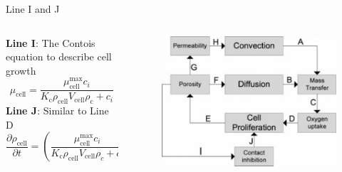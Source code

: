 \documentclass[11pt,t]{beamer}
\begin{document}
\begin{frame}[fragile]{Line I and J}  

	\begin{columns}[t]
		\begin{column}{.75\textwidth}
\textbf{Line I}: The Contois equation  to describe cell growth
\[
\mu _ { \mathrm { cell } } = \frac { \mu _ { \mathrm { cell } } ^ { \max } c _ { i } } { K _ { \mathrm { c } } \rho _ { \mathrm { cell } } V _ { \mathrm { cell } } \rho _ { \mathrm { c } } + c _ { i } }
\]
\textbf{Line J}: Similar to Line D
\[
\frac { \partial \rho _ { \mathrm { cell } } } { \partial t } = \left( \frac { \mu _ { \mathrm { cell } } ^ { \max } c _ { i } } { K _ { \mathrm { c } } \rho _ { \mathrm { cell } } V _ { \mathrm { cell } } \rho _ { c } + c _ { i } } - k _ { d } \right) \rho _ { \mathrm { cell } }
\]
		\end{column}
		\begin{column}{.25\textwidth}
			
			\begin{figure}
			\centering
			\includegraphics[width=\textwidth]{math_scheme}
			
			\end{figure}
		\end{column}
	\end{columns}	
		
\end{frame}
\end{document}
